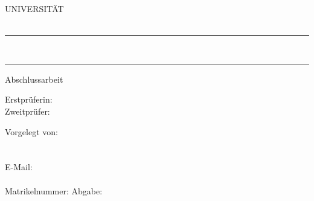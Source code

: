 \begin{titlepage}

\noindent\normalsize{UNIVERSITÄT} \\
\normalsize{\institut} \\
\normalsize{\semester}

\begin{center}
\vspace{2.5cm}
\noindent\rule{\textwidth}{1.5pt}
\vspace{0.3cm}



\LARGE{\textbf{\titel}} \\

\vspace{0.3cm}
\noindent\rule{\textwidth}{1.5pt}
\vspace{1cm}

\Large{Abschlussarbeit}
\vspace{0.5cm}

\normalsize{Erstprüferin: \betreuerin} \\
\normalsize{Zweitprüfer: \betreuer} \\
\end{center}


\vspace{3cm}

\noindent\normalsize{Vorgelegt von:} \\
\noindent\normalsize{\autor} \\ 
\normalsize{\adresse} \\
\normalsize{E-Mail: \email} \\
\normalsize{\studium} \\
\normalsize{Matrikelnummer: \matrikel} \hfill \normalsize{Abgabe: \abgabe} 



\end{titlepage}

\restoregeometry %

